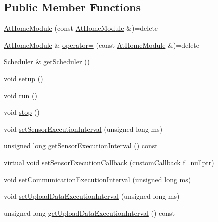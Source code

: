 \subsection*{Public Member Functions}
\begin{DoxyCompactItemize}
\item 
\mbox{\hyperlink{classathome_1_1module_1_1_at_home_module_ad78045943a579874ec16e14cf976eada}{At\+Home\+Module}} (const \mbox{\hyperlink{classathome_1_1module_1_1_at_home_module}{At\+Home\+Module}} \&)=delete
\item 
\mbox{\hyperlink{classathome_1_1module_1_1_at_home_module}{At\+Home\+Module}} \& \mbox{\hyperlink{classathome_1_1module_1_1_at_home_module_aec07a48057f5d52c9adaea375a6a7ad4}{operator=}} (const \mbox{\hyperlink{classathome_1_1module_1_1_at_home_module}{At\+Home\+Module}} \&)=delete
\item 
Scheduler \& \mbox{\hyperlink{classathome_1_1module_1_1_at_home_module_a954f37f05e5738f270a35fef58782ba6}{get\+Scheduler}} ()
\item 
void \mbox{\hyperlink{classathome_1_1module_1_1_at_home_module_a5354c736954a788c51e7cf25f6ccf89d}{setup}} ()
\item 
void \mbox{\hyperlink{classathome_1_1module_1_1_at_home_module_ac39915bf4a255e3610515bc18af3029d}{run}} ()
\item 
void \mbox{\hyperlink{classathome_1_1module_1_1_at_home_module_a5589c1eb7edd2ab45d0a3de7bb475bbe}{stop}} ()
\item 
void \mbox{\hyperlink{classathome_1_1module_1_1_at_home_module_a9a3b04d8f83ecbe0e8e368b697449326}{set\+Sensor\+Execution\+Interval}} (unsigned long ms)
\item 
unsigned long \mbox{\hyperlink{classathome_1_1module_1_1_at_home_module_ae0d4458da2bafd104386671d300fb562}{get\+Sensor\+Execution\+Interval}} () const
\item 
virtual void \mbox{\hyperlink{classathome_1_1module_1_1_at_home_module_af1466a92bf4e3d0dc45adff11d8ee5fd}{set\+Sensor\+Execution\+Callback}} (custom\+Callback f=nullptr)
\item 
void \mbox{\hyperlink{classathome_1_1module_1_1_at_home_module_ad28a042bd9f793d9dbd944ec4f76156b}{set\+Communication\+Execution\+Interval}} (unsigned long ms)
\item 
void \mbox{\hyperlink{classathome_1_1module_1_1_at_home_module_aa02b94ab5009d59d337144db364053a6}{set\+Upload\+Data\+Execution\+Interval}} (unsigned long ms)
\item 
unsigned long \mbox{\hyperlink{classathome_1_1module_1_1_at_home_module_a6186e04da0e46cf463d24947538380bb}{get\+Upload\+Data\+Execution\+Interval}} () const

\end{DoxyCompactItemize}
